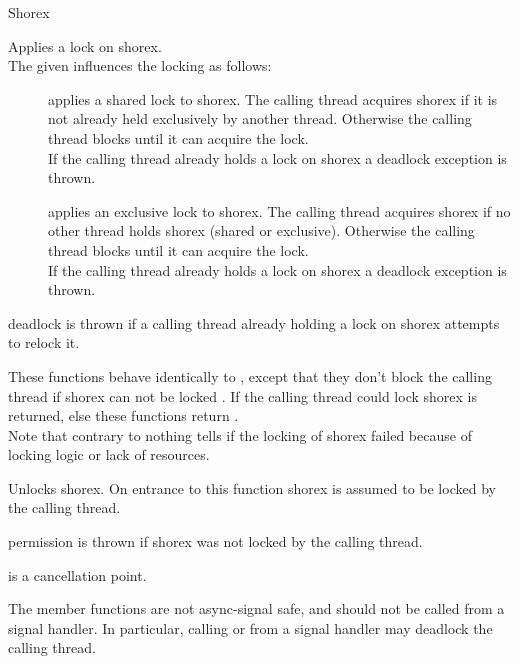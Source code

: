 \begin{classpage}{Shorex}
\begin{mandescription}
  Applies a lock on  shorex.\\
  The given  influences the locking as follows:
  \begin{description}
    \item[] applies a shared lock to 
      shorex. The calling thread acquires  shorex if it is
      not already held exclusively by another thread. Otherwise the
      calling thread blocks until it can acquire the lock.\\
      If the calling thread already holds a lock on  shorex
      a deadlock exception is thrown.
    \item[] applies an exclusive lock to
       shorex. The calling thread acquires 
      shorex if no other thread holds  shorex (shared or
      exclusive). Otherwise the calling thread blocks until it can
      acquire the lock.\\
      If the calling thread already holds a lock on  shorex
      a deadlock exception is thrown.
  \end{description}
  \begin{exception}
    \item[deadlock] is thrown if a calling thread
      already holding a lock on  shorex attempts to relock
      it.
  \end{exception}

  These functions behave identically to
  , except that they don't block the
  calling thread if  shorex can not be locked . If the
  calling thread could lock  shorex  is
  returned, else these functions return
  .\\
  Note that contrary to  nothing tells if the
  locking of  shorex failed because of locking logic or
  lack of resources.

  Unlocks  shorex. On entrance to this function 
  shorex is assumed to be locked by the calling thread.
  \begin{exception}
    \item[permission] is thrown if 
      shorex was not locked by the calling thread.
  \end{exception}
\end{mandescription}

 is a cancellation point.

The  member functions are not async-signal safe, and
should not be called from a signal handler. In particular, calling
 or  from a signal handler
may deadlock the calling thread.

\end{classpage}

